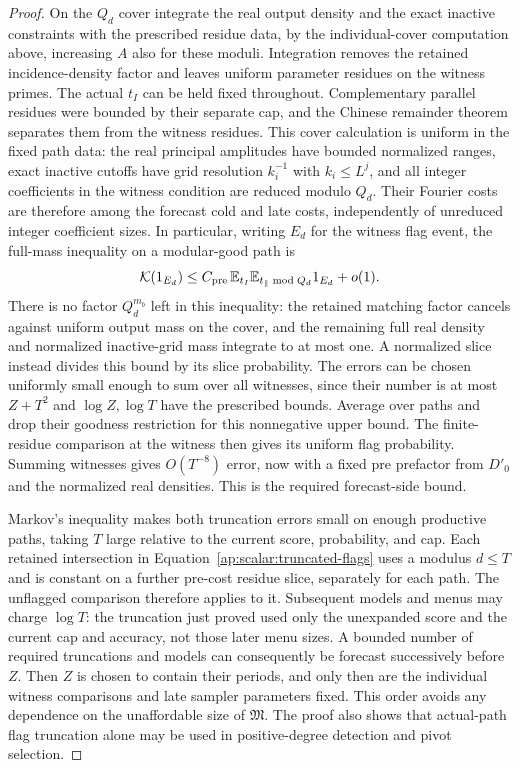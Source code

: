 \begin{proof}
On the $Q_d$ cover integrate the real output density and the exact
inactive constraints with the prescribed residue data, by the
individual-cover computation above, increasing $A$ also for these
moduli. Integration removes the retained incidence-density factor
and leaves uniform parameter residues on the witness primes. The
actual $t_I$ can be held fixed throughout. Complementary parallel
residues were bounded by their separate cap, and the Chinese
remainder theorem separates them from the witness residues.
This cover calculation is uniform in the fixed path data: the real
principal amplitudes have bounded normalized ranges, exact inactive
cutoffs have grid resolution $k_i^{-1}$ with $k_i\le L^j$, and all
integer coefficients in the witness condition are reduced modulo
$Q_d$. Their Fourier costs are therefore among the forecast cold and
late costs, independently of unreduced integer coefficient sizes.
In particular, writing $E_d$ for the witness flag event, the full-mass
inequality on a modular-good path is
\begin{equation}\label{ap:scalar:witness-cancellation}
 \mathcal K(1_{E_d})
 \le C_{\rm pre}\,
       \mathbb E_{t_I}\mathbb E_{t_\parallel\bmod Q_d}1_{E_d}+o(1).
\end{equation}
There is no factor $Q_d^{m_b}$ left in this inequality: the retained
matching factor cancels against uniform output mass on the cover,
and the remaining full real density and normalized inactive-grid
mass integrate to at most one. A normalized slice instead divides
this bound by its slice probability. The errors can be chosen
uniformly small enough to sum over all witnesses, since their number
is at most $Z+T^2$ and $\log Z,\log T$ have the prescribed bounds.
Average over paths and drop their goodness restriction for this
nonnegative upper bound. The finite-residue comparison at the witness
then gives its uniform flag probability. Summing witnesses gives
$O(T^{-8})$ error, now with a fixed pre prefactor from $D'_0$ and the
normalized real densities. This is the required forecast-side bound.

Markov's inequality makes both truncation errors small on enough
productive paths, taking $T$ large relative to the current score,
probability, and cap. Each retained intersection in
Equation~\eqref{ap:scalar:truncated-flags} uses a modulus $d\le T$ and
is constant on a further pre-cost residue slice, separately for each
path. The unflagged comparison therefore applies to it. Subsequent
models and menus may charge $\log T$: the truncation just proved used
only the unexpanded score and the current cap and accuracy, not those
later menu sizes. A bounded number of required truncations and models
can consequently be forecast successively before $Z$. Then $Z$ is
chosen to contain their periods, and only then are the individual
witness comparisons and late sampler parameters fixed. This order
avoids any dependence on the unaffordable size of
$\mathfrak M$. The proof also shows that actual-path flag truncation
alone may be used in positive-degree detection and pivot selection.
\end{proof}

